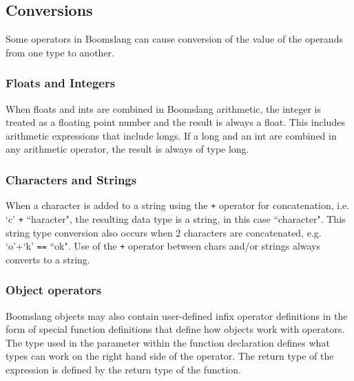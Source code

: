 \documentclass{article}
\begin{document}
\subsection{Conversions}
\label{sec:conversions}
Some operators in Boomslang can cause conversion of the value of the operands from one type to another.  

\subsubsection{Floats and Integers}
When floats and ints are combined in Boomslang arithmetic, the integer is treated as a floating point number and the result is always a float.  This includes arithmetic expressions that include longs. If a long and an int are combined in any arithmetic operator, the result is always of type long.

\subsubsection{Characters and Strings}
When a character is added to a string using the \texttt{+} operator for concatenation, i.e. `c' \texttt{+} ``haracter", the resulting data type is a string, in this case ``character".  This string type conversion also occurs when 2 characters are concatenated, e.g. `o'+`k' \texttt{==} ``ok".  Use of the \texttt{+} operator between chars and/or strings always converts to a string.

\subsubsection{Object operators}
\label{sec:object-operators}

Boomslang objects may also contain user-defined infix operator definitions in the form of special function definitions that define how objects work with operators.  The type used in the parameter within the function declaration defines what types can work on the right hand side of the operator.  The return type of the expression is defined by the return  type of the function.  
\end{document}
